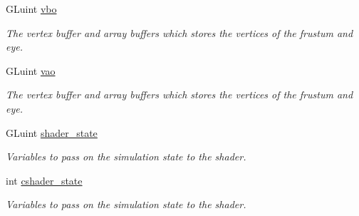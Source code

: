 {\bf }\par
\begin{DoxyCompactItemize}
\item 
G\+Luint \hyperlink{classcft_1_1Scene_ac7730d3b7bf7fad605b4aa1d665c93f7}{vbo}\hypertarget{classcft_1_1Scene_ac7730d3b7bf7fad605b4aa1d665c93f7}{}\label{classcft_1_1Scene_ac7730d3b7bf7fad605b4aa1d665c93f7}

\begin{DoxyCompactList}\small\item\em The vertex buffer and array buffers which stores the vertices of the frustum and eye. \end{DoxyCompactList}\item 
G\+Luint \hyperlink{classcft_1_1Scene_a4b6ef5cb39ee179dd5f7b547ccdb998c}{vao}\hypertarget{classcft_1_1Scene_a4b6ef5cb39ee179dd5f7b547ccdb998c}{}\label{classcft_1_1Scene_a4b6ef5cb39ee179dd5f7b547ccdb998c}

\begin{DoxyCompactList}\small\item\em The vertex buffer and array buffers which stores the vertices of the frustum and eye. \end{DoxyCompactList}\end{DoxyCompactItemize}

{\bf }\par
\begin{DoxyCompactItemize}
\item 
G\+Luint \hyperlink{classcft_1_1Scene_a2004a0d53bcd06f76bb4e3cc86290b06}{shader\+\_\+state}\hypertarget{classcft_1_1Scene_a2004a0d53bcd06f76bb4e3cc86290b06}{}\label{classcft_1_1Scene_a2004a0d53bcd06f76bb4e3cc86290b06}

\begin{DoxyCompactList}\small\item\em Variables to pass on the simulation state to the shader. \end{DoxyCompactList}\item 
int \hyperlink{classcft_1_1Scene_a4eedebe81bff5c376ec42b39d34c4f6b}{cshader\+\_\+state}\hypertarget{classcft_1_1Scene_a4eedebe81bff5c376ec42b39d34c4f6b}{}\label{classcft_1_1Scene_a4eedebe81bff5c376ec42b39d34c4f6b}

\begin{DoxyCompactList}\small\item\em Variables to pass on the simulation state to the shader. \end{DoxyCompactList}\end{DoxyCompactItemize}

